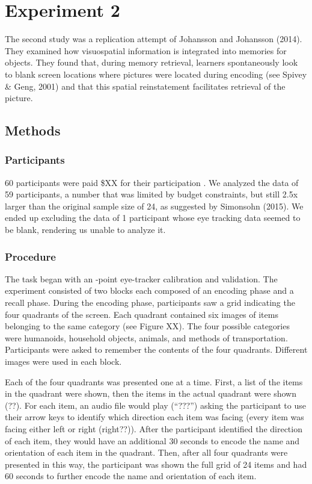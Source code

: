 \documentclass[
  english,
  man,floatsintext]{apa6}
\begin{document}
\hypertarget{experiment-2}{%
\section{Experiment 2}\label{experiment-2}}

The second study was a replication attempt of Johansson and Johansson (2014). They examined how visuospatial information is integrated into memories for objects. They found that, during memory retrieval, learners spontaneously look to blank screen locations where pictures were located during encoding (see Spivey \& Geng, 2001) and that this spatial reinstatement facilitates retrieval of the picture.

\hypertarget{methods-1}{%
\subsection{Methods}\label{methods-1}}

\hypertarget{participants-2}{%
\subsubsection{Participants}\label{participants-2}}

60 participants were paid \$XX for their participation . We analyzed the data of 59 participants, a number that was limited by budget constraints, but still 2.5x larger than the original sample size of 24, as suggested by Simonsohn (2015). We ended up excluding the data of 1 participant whose eye tracking data seemed to be blank, rendering us unable to analyze it.

\hypertarget{procedure-1}{%
\subsubsection{Procedure}\label{procedure-1}}

The task began with an -point eye-tracker calibration and validation. The experiment consisted of two blocks each composed of an encoding phase and a recall phase. During the encoding phase, participants saw a grid indicating the four quadrants of the screen. Each quadrant contained six images of items belonging to the same category (see Figure XX). The four possible categories were humanoids, household objects, animals, and methods of transportation. Participants were asked to remember the contents of the four quadrants. Different images were used in each block.

Each of the four quadrants was presented one at a time. First, a list of the items in the quadrant were shown, then the items in the actual quadrant were shown (??). For each item, an audio file would play (``???'') asking the participant to use their arrow keys to identify which direction each item was facing (every item was facing either left or right (right??)). After the participant identified the direction of each item, they would have an additional 30 seconds to encode the name and orientation of each item in the quadrant. Then, after all four quadrants were presented in this way, the participant was shown the full grid of 24 items and had 60 seconds to further encode the name and orientation of each item.
\end{document}
